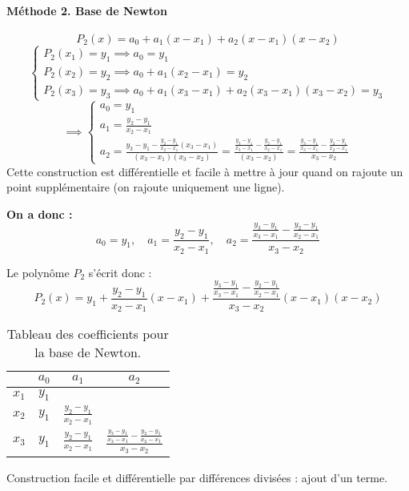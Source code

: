\documentclass{article}
\begin{document}
\paragraph{Méthode 2. Base de Newton}

\[
P_2(x) = a_0 + a_1 (x-x_1) + a_2 (x-x_1)(x-x_2)
\]
\[
\begin{cases}
P_2(x_1) = y_1 \implies a_0 = y_1 \\
P_2(x_2) = y_2 \implies a_0 + a_1 (x_2-x_1) = y_2 \\
P_2(x_3) = y_3 \implies a_0 + a_1 (x_3-x_1) + a_2 (x_3-x_1)(x_3-x_2) = y_3
\end{cases}
\]
\[
\implies
\begin{cases}
a_0 = y_1 \\
a_1 = \frac{y_2-y_1}{x_2-x_1} \\
a_2 = \frac{y_3 - y_1 - \frac{y_2-y_1}{x_2-x_1} (x_3-x_1)}{(x_3-x_1)(x_3-x_2)} = \frac{\frac{y_3-y_1}{x_3-x_1} - \frac{y_2-y_1}{x_2-x_1}}{(x_3-x_2)} = \frac{\frac{y_3-y_1}{x_3-x_1} - \frac{y_2-y_1}{x_2-x_1}}{x_3-x_2}
\end{cases}
\]
Cette construction est différentielle et facile à mettre à jour quand on rajoute un point supplémentaire (on rajoute uniquement une ligne).

\textbf{On a donc :}
\[
a_0 = y_1, \quad a_1 = \frac{y_2-y_1}{x_2-x_1}, \quad a_2 = \frac{\frac{y_3-y_1}{x_3-x_1} - \frac{y_2-y_1}{x_2-x_1}}{x_3-x_2}
\]

Le polynôme $P_2$ s'écrit donc :
\[
P_2(x) = y_1 + \frac{y_2-y_1}{x_2-x_1} (x-x_1) + \frac{\frac{y_3-y_1}{x_3-x_1} - \frac{y_2-y_1}{x_2-x_1}}{x_3-x_2} (x-x_1)(x-x_2)
\]

\begin{table}[H]
    \centering
    \begin{tabular}{|c|c|c|c|}
        \hline
         & $a_0$ & $a_1$ & $a_2$ \\
        \hline
        $x_1$ & $y_1$ & &  \\
        \hline
        $x_2$ & $y_1$ & $\frac{y_2-y_1}{x_2-x_1}$ &  \\
        \hline
        $x_3$ & $y_1$ & $\frac{y_2-y_1}{x_2-x_1}$ & $\frac{\frac{y_3-y_1}{x_3-x_1} - \frac{y_2-y_1}{x_2-x_1}}{x_3-x_2}$ \\
        \hline
    \end{tabular}
    \caption{Tableau des coefficients pour la base de Newton.}
    \label{tab:newton_coeffs}
\end{table}
Construction facile et différentielle par différences divisées : ajout d'un terme.
\end{document}

